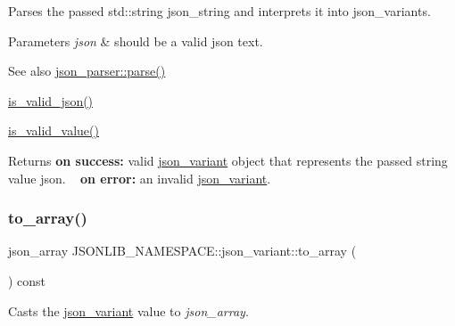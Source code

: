 Parses the passed std\+::string {\ttfamily json\+\_\+string} and interprets it into json\+\_\+variants. 


\begin{DoxyParams}{Parameters}
{\em json} & should be a valid json text. \\
\hline
\end{DoxyParams}
\begin{DoxySeeAlso}{See also}
\hyperlink{classJSONLIB__NAMESPACE_1_1json__parser_a8f097c29f98ed795a92b5941c9070f8b}{json\+\_\+parser\+::parse()} 

\hyperlink{classJSONLIB__NAMESPACE_1_1json__variant_a158e3148d9256af3d1b8251b2ca7b6c4}{is\+\_\+valid\+\_\+json()} 

\hyperlink{classJSONLIB__NAMESPACE_1_1json__variant_a224aab2dd56e3928dd893be8b7f3367a}{is\+\_\+valid\+\_\+value()} 
\end{DoxySeeAlso}
\begin{DoxyReturn}{Returns}
{\bfseries on success\+:} valid \hyperlink{classJSONLIB__NAMESPACE_1_1json__variant}{json\+\_\+variant} object that represents the passed string value {\ttfamily json}. ~\newline
 {\bfseries on error\+:} an invalid \hyperlink{classJSONLIB__NAMESPACE_1_1json__variant}{json\+\_\+variant}. 
\end{DoxyReturn}
\mbox{\label{classJSONLIB__NAMESPACE_1_1json__variant_a9c7e9d81370ff98393d2fd3ee00d013a}} 
\subsubsection{\texorpdfstring{to\+\_\+array()}{to\_array()}\hspace{0.1cm}{\footnotesize\ttfamily [1/4]}}
{\footnotesize\ttfamily json\+\_\+array J\+S\+O\+N\+L\+I\+B\+\_\+\+N\+A\+M\+E\+S\+P\+A\+C\+E\+::json\+\_\+variant\+::to\+\_\+array (\begin{DoxyParamCaption}{ }\end{DoxyParamCaption}) const}



Casts the \hyperlink{classJSONLIB__NAMESPACE_1_1json__variant}{json\+\_\+variant} value to {\itshape json\+\_\+array}. 


